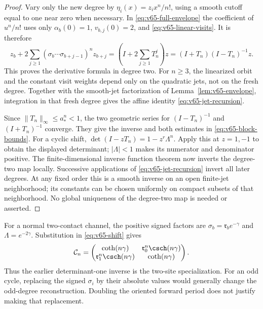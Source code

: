 \begin{proof}
Vary only the new degree by $\eta_i(x)=z_i x^n/n!$, using a smooth
cutoff equal to one near zero when necessary.  In
\eqref{eq:v65-full-envelope} the coefficient of $u^n/n!$ uses only
$\alpha_b(0)=1$, $v_{b,j}(0)=2$, and
\eqref{eq:v65-linear-visits}.  It is therefore
\[
 z_b+2\sum_{j\ge1}
   (\sigma_b\cdots\sigma_{b+j-1})^n z_{b+j}
   =\left(I+2\sum_{j\ge1}T_n^j\right)z
   =(I+T_n)(I-T_n)^{-1}z.
\]
This proves the derivative formula in degree two.  For $n\ge3$, the
linearized orbit and the constant visit weights depend only on the
quadratic jets, not on the fresh degree.  Together with the smooth-jet
factorization of Lemma~\ref{lem:v65-envelope}, integration in that
fresh degree gives the affine identity
\eqref{eq:v65-jet-recursion}.

Since $\|T_n\|_\infty\le a_*^n<1$, the two geometric series for
$(I-T_n)^{-1}$ and $(I+T_n)^{-1}$ converge.  They give the inverse
and both estimates in \eqref{eq:v65-block-bounds}.  For a cyclic shift,
$\det(I-zT_n)=1-z^r\Lambda^n$.  Apply this at $z=1,-1$ to
obtain the displayed determinant; $|\Lambda|<1$ makes its numerator
and denominator positive.  The finite-dimensional inverse function
theorem now inverts the degree-two map locally.  Successive applications
of \eqref{eq:v65-jet-recursion} invert all later degrees.  At any fixed
order this is a smooth inverse on an open finite-jet neighborhood; its
constants can be chosen uniformly on compact subsets of that neighborhood.
No global uniqueness of the degree-two map is needed or asserted.
\end{proof}

For a normal two-contact channel, the positive signed factors are
$\sigma_b=\mathfrak r_b e^{-\gamma}$ and
$\Lambda=e^{-2\gamma}$.  Substitution in \eqref{eq:v65-shift} gives
\[
 \mathcal C_n=
 \begin{pmatrix}
 \coth(n\gamma)&\mathfrak r_0^n\csch(n\gamma)\\
 \mathfrak r_1^n\csch(n\gamma)&\coth(n\gamma)
 \end{pmatrix}.
\]
Thus the earlier determinant-one inverse is the two-site specialization.
For an odd cycle, replacing the signed $\sigma_i$ by their absolute
values would generally change the odd-degree reconstruction.  Doubling
the oriented forward period does not justify making that replacement.

